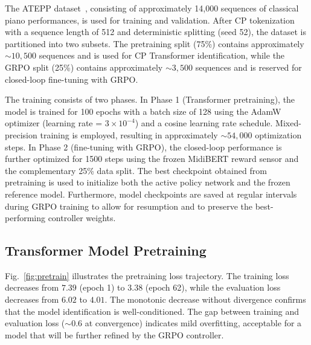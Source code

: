\documentclass[letterpaper, 10 pt, conference]{ieeeconf}
\begin{document}

The ATEPP dataset~\cite{atepp}, consisting of approximately 14,000 sequences of classical piano performances, is used for training and validation. After CP tokenization with a sequence length of 512 and deterministic splitting (seed 52), the dataset is partitioned into two subsets. The pretraining split (75\%) contains approximately ${\sim}10{,}500$ sequences and is used for CP Transformer identification, while the GRPO split (25\%) contains approximately ${\sim}3{,}500$ sequences and is reserved for closed-loop fine-tuning with GRPO.


The training consists of two phases. In Phase 1 (Transformer pretraining), the model is trained for 100 epochs with a batch size of 128 using the AdamW optimizer (learning rate = $3 \times 10^{-4}$) and a cosine learning rate schedule. Mixed-precision training is employed, resulting in approximately ${\sim}54{,}000$ optimization steps.
In Phase 2 (fine-tuning with GRPO), the closed-loop performance is further optimized for 1500 steps using the frozen MidiBERT reward sensor and the complementary 25\% data split. The best checkpoint obtained from pretraining is used to initialize both the active policy network and the frozen reference model. Furthermore, model checkpoints are saved at regular intervals during GRPO training to allow for resumption and to preserve the best-performing controller weights.

\subsection{Transformer Model Pretraining}

Fig.~\ref{fig:pretrain} illustrates the pretraining loss trajectory.
The training loss decreases from $7.39$ (epoch 1) to $3.38$ (epoch 62), while the evaluation loss decreases from $6.02$ to $4.01$.
The monotonic decrease without divergence confirms that the model identification is well-conditioned.
The gap between training and evaluation loss (${\sim}0.6$ at convergence) indicates mild overfitting, acceptable for a model that will be further refined by the GRPO controller.
\end{document}
